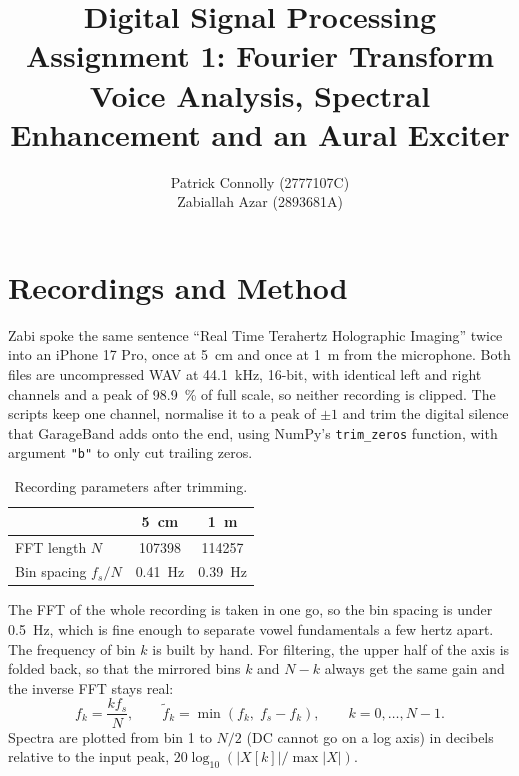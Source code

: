\documentclass[11pt,a4paper]{article}
\title{\textbf{Digital Signal Processing}\\[4pt]
       Assignment 1: Fourier Transform\\[2pt]
       \large Voice Analysis, Spectral Enhancement and an Aural Exciter}
\author{%
  Patrick Connolly (2777107C)\\
  Zabiallah Azar (2893681A)}
\date{}
\begin{document}
\maketitle

\section*{Recordings and Method}
\label{sec:method}

Zabi spoke the same sentence ``Real Time Terahertz Holographic Imaging'' twice into an iPhone 17 Pro, once at
\SI{5}{\centi\metre} and once at \SI{1}{\metre} from the microphone. Both
files are uncompressed WAV at \SI{44.1}{\kilo\hertz}, 16-bit, with identical
left and right channels and a peak of \SI{98.9}{\percent} of full scale, so
neither recording is clipped. The scripts keep one channel, normalise it to a
peak of $\pm1$ and trim the digital silence that GarageBand adds onto the end, using NumPy's \texttt{trim\_zeros} function, with argument \texttt{"b"} to only cut trailing zeros.

\begin{table}[htbp]
  \centering
  \caption{Recording parameters after trimming.}
  \label{tab:recording}
  \begin{tabular}{@{}lcc@{}}
    \toprule
    & \SI{5}{\centi\metre} & \SI{1}{\metre} \\
    \midrule
    FFT length $N$             & \num{107398} & \num{114257} \\
    Bin spacing $f_s/N$        & \SI{0.41}{\hertz} & \SI{0.39}{\hertz} \\
    \bottomrule
  \end{tabular}
\end{table}

The FFT of the whole recording is taken in one go, so the bin spacing is
under \SI{0.5}{\hertz}, which is fine enough to separate vowel fundamentals
a few hertz apart. The frequency of bin $k$ is built by hand. For filtering, the upper half of the axis is
folded back, so that the mirrored bins $k$ and $N-k$ always get the same gain
and the inverse FFT stays real:
\begin{equation}
  f_k = \frac{k f_s}{N},
  \qquad
  \tilde f_k = \min\!\left(f_k,\; f_s - f_k\right),
  \qquad k = 0,\dots,N-1.
  \label{eq:bins}
\end{equation}
Spectra are plotted from bin 1 to $N/2$ (DC cannot go on a log axis) in
decibels relative to the input peak, $20\log_{10}\!\left(|X[k]|/\max|X|\right)$.
\end{document}
